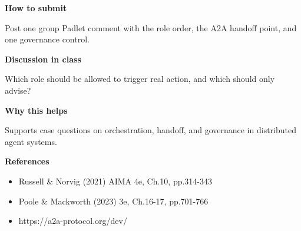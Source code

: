 \documentclass[11pt]{article}
\begin{document}
\begin{tcolorbox}[colback=white,colframe=MidnightBlue,title={Q4 Collaborative Mini-Case},fonttitle=\bfseries,breakable]
{\large\bfseries\color{MidnightBlue} How to submit}\par\medskip
Post one group Padlet comment with the role order, the A2A handoff point, and one governance control.

{\large\bfseries\color{MidnightBlue} Discussion in class}\par\medskip
Which role should be allowed to trigger real action, and which should only advise?

{\large\bfseries\color{MidnightBlue} Why this helps}\par\medskip
Supports case questions on orchestration, handoff, and governance in distributed agent systems.

{\large\bfseries\color{MidnightBlue} References}\par\medskip
\begin{itemize}\item Russell \& Norvig (2021) AIMA 4e, Ch.10, pp.314-343
\item Poole \& Mackworth (2023) 3e, Ch.16-17, pp.701-766
\item https://a2a-protocol.org/dev/\end{itemize}
\end{tcolorbox}
\end{document}
